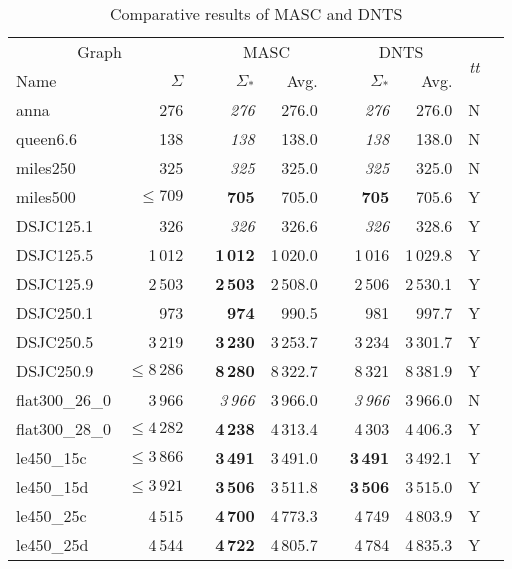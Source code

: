 \documentclass{elsart}
\begin{document}
\begin{table}\begin{scriptsize}
\caption{Comparative results of MASC and DNTS} \label{table_MASC_TS}
\begin{tabular}{lrcrrrrrcl}
\hline
\multicolumn{2}{c}{Graph} && \multicolumn{2}{c}{MASC} & &\multicolumn{2}{c}{DNTS} &\multirow{2}{*}{\emph{tt}}\\  
\cline{1-2}\cline{4-5} \cline{7-8} 
Name&$\Sigma$&& $\Sigma_*$ & Avg. & & $\Sigma_*$ & Avg. \\
\hline
anna              & 276 && \emph{276} & 276.0 & &\emph{276}   & 276.0 & N\\
queen6.6          & 138 && \textit{138} & 138.0 && \emph{138}  & 138.0 &N\\
miles250          & 325    && \textit{325} & 325.0 & &\emph{325} & 325.0 &N \\
miles500          & $\le 709$   && \textbf{705} & 705.0 & & \textbf{705} & 705.6 &Y\\
DSJC125.1         & 326  && \textit{326}  & 326.6 & & \emph{326}  & 328.6 &Y\\
DSJC125.5         & 1\,012   && \textbf{1\,012}  & 1\,020.0  & & 1\,016  & 1\,029.8  &Y\\
DSJC125.9         & 2\,503 && \textbf{2\,503}  & 2\,508.0   & & 2\,506  & 2\,530.1  &Y \\
DSJC250.1         & 973  && \textbf{974}  & 990.5    &  & 981  & 997.7   &Y \\
DSJC250.5          &3\,219  &&\textbf{3\,230}  & 3\,253.7  & &3\,234  & 3\,301.7  &Y\\
DSJC250.9         & $\le 8\,286$  && \textbf{8\,280}  & 8\,322.7   && 8\,321  & 8\,381.9   &Y\\
flat300\_26\_0    & 3\,966 && \textit{3\,966} & 3\,966.0  & & \emph{3\,966} & 3\,966.0  &N\\
flat300\_28\_0    &  $\le 4\,282$ &&  \textbf{4\,238} & 4\,313.4 & &  4\,303 & 4\,406.3 &Y\\
le450\_15c        & $\le 3\,866$  && \textbf{3\,491} & 3\,491.0   & & \textbf{3\,491} & 3\,492.1  &Y \\
le450\_15d        &  $\le 3\,921$ &&  \textbf{3\,506} & 3\,511.8  &  &  \textbf{3\,506} & 3\,515.0 &Y \\
le450\_25c       & 4\,515  && \textbf{4\,700} & 4\,773.3  & & 4\,749 & 4\,803.9  &Y\\
le450\_25d        & 4\,544 && \textbf{4\,722} & 4\,805.7 & & 4\,784 & 4\,835.3 &Y\\
\hline
\end{tabular}
\end{scriptsize}
\end{table}
\end{document}
